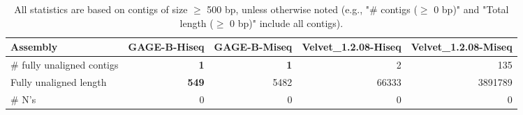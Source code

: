 \documentclass[12pt,a4paper]{article}
\begin{document}
\begin{table}[ht]
\begin{center}
\caption{All statistics are based on contigs of size $\geq$ 500 bp, unless otherwise noted (e.g., "\# contigs ($\geq$ 0 bp)" and "Total length ($\geq$ 0 bp)" include all contigs).}
\begin{tabular}{|l*{4}{|r}|}
\hline
Assembly & GAGE-B-Hiseq & GAGE-B-Miseq & Velvet\_1.2.08-Hiseq & Velvet\_1.2.08-Miseq \\ \hline
\# fully unaligned contigs & {\bf 1} & {\bf 1} & 2 & 135 \\ \hline
Fully unaligned length & {\bf 549} & 5482 & 66333 & 3891789 \\ \hline
\# N's & 0 & 0 & 0 & 0 \\ \hline
\end{tabular}
\end{center}
\end{table}
\end{document}
